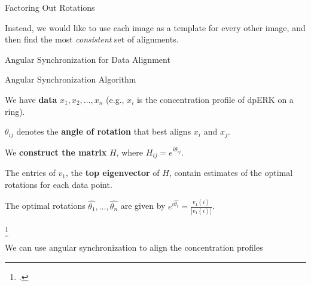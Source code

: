 \begin{frame}{Factoring Out Rotations}
	
	Instead, we would like to use each image as a template for every other image, and then find the most {\em consistent} set of alignments.
	
	\centering
	
\end{frame}

\begin{frame}{Angular Synchronization for Data Alignment}

	\begin{block}{Angular Synchronization Algorithm \footnotemark}
		{\scriptsize 
		 We have {\bf data} $x_1, x_2, \dots, x_n$ (e.g., $x_i$ is the concentration profile of dpERK on a ring).
        
        $\theta_{ij}$ denotes the {\bf angle of rotation} that best aligns $x_i$ and $x_j$.

        We {\bf construct the matrix} $H$, where $H_{ij} = e^{i \theta_{ij}}$.

		The entries of $v_1$, the {\bf top eigenvector} of $H$, contain estimates of the optimal rotations for each data point.

		The optimal rotations $\hat{\theta_1}, \dots, \hat{\theta_n}$ are given by $e^{i \hat{\theta_i}} = \frac{v_1(i)}{|v_1(i)|}$.
		\par}
	\end{block}	
	\footcitetext{singer2011angular}
	
	We can use angular synchronization to align the concentration profiles
	

\end{frame}


